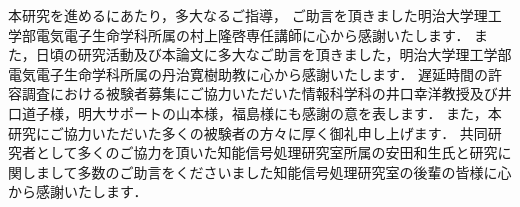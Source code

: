 \begin{acknowledgement}
本研究を進めるにあたり，多大なるご指導，
ご助言を頂きました明治大学理工学部電気電子生命学科所属の村上隆啓専任講師に心から感謝いたします．
また，日頃の研究活動及び本論文に多大なご助言を頂きました，明治大学理工学部電気電子生命学科所属の丹治寛樹助教に心から感謝いたします．
遅延時間の許容調査における被験者募集にご協力いただいた情報科学科の井口幸洋教授及び井口道子様，明大サポートの山本様，福島様にも感謝の意を表します．
また，本研究にご協力いただいた多くの被験者の方々に厚く御礼申し上げます．
共同研究者として多くのご協力を頂いた知能信号処理研究室所属の安田和生氏と研究に関しまして多数のご助言をくださいました知能信号処理研究室の後輩の皆様に心から感謝いたします．
\makesignature
\end{acknowledgement}
